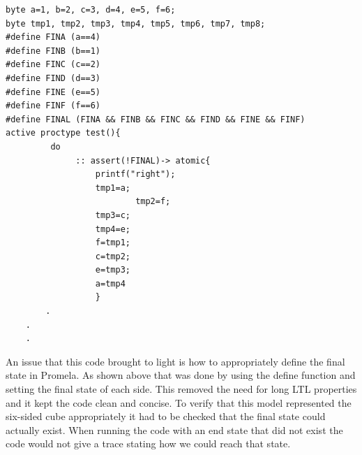 \documentclass{article}
\begin{document}
\begin{verbatim}
byte a=1, b=2, c=3, d=4, e=5, f=6;
byte tmp1, tmp2, tmp3, tmp4, tmp5, tmp6, tmp7, tmp8;
#define FINA (a==4)
#define FINB (b==1)
#define FINC (c==2)
#define FIND (d==3)
#define FINE (e==5)
#define FINF (f==6)
#define FINAL (FINA && FINB && FINC && FIND && FINE && FINF)
active proctype test(){
	     do
	          :: assert(!FINAL)-> atomic{
		          printf("right");
		          tmp1=a;
				          tmp2=f;
		          tmp3=c;
		          tmp4=e;
		          f=tmp1;
		          c=tmp2;
		          e=tmp3;
		          a=tmp4
		          }
	    .
    .
    .

\end{verbatim}
An issue that this code brought to light is how to appropriately define the final state in Promela. As shown above that was done by using the define function and setting the final state of each side. This removed the need for long LTL properties and it kept the code clean and concise. To verify that this model represented the six-sided cube appropriately it had to be checked that the final state could actually exist. When running the code with an end state that did not exist the code would not give a trace stating how we could reach that state. 
\end{document}

